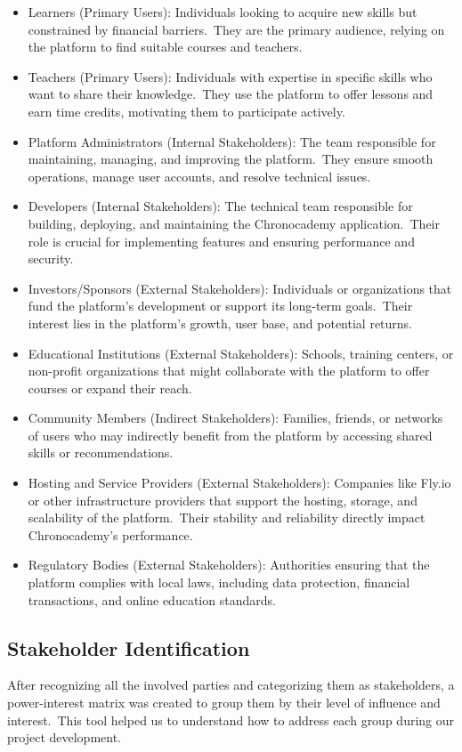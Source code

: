 \begin{itemize}
\item Learners (Primary Users): Individuals looking to acquire new skills but constrained by financial barriers.\ They are the primary audience, relying on the platform to find suitable courses and teachers.
\item Teachers (Primary Users): Individuals with expertise in specific skills who want to share their knowledge.\ They use the platform to offer lessons and earn time credits, motivating them to participate actively.
\item Platform Administrators (Internal Stakeholders): The team responsible for maintaining, managing, and improving the platform.\ They ensure smooth operations, manage user accounts, and resolve technical issues.
\item Developers (Internal Stakeholders): The technical team responsible for building, deploying, and maintaining the Chronocademy application.\ Their role is crucial for implementing features and ensuring performance and security.
\item Investors/Sponsors (External Stakeholders): Individuals or organizations that fund the platform’s development or support its long-term goals.\ Their interest lies in the platform’s growth, user base, and potential returns.
\item Educational Institutions (External Stakeholders): Schools, training centers, or non-profit organizations that might collaborate with the platform to offer courses or expand their reach.
\item Community Members (Indirect Stakeholders): Families, friends, or networks of users who may indirectly benefit from the platform by accessing shared skills or recommendations.
\item Hosting and Service Providers (External Stakeholders): Companies like Fly.io or other infrastructure providers that support the hosting, storage, and scalability of the platform.\ Their stability and reliability directly impact Chronocademy’s performance.
\item Regulatory Bodies (External Stakeholders): Authorities ensuring that the platform complies with local laws, including data protection, financial transactions, and online education standards.
\end{itemize}

\subsection{Stakeholder Identification}\label{subsec:stakeholders-identification}
After recognizing all the involved parties and categorizing them as stakeholders, a power-interest matrix was created to group them by their level of influence and interest.\ This tool helped us to understand how to address each group during our project development.

